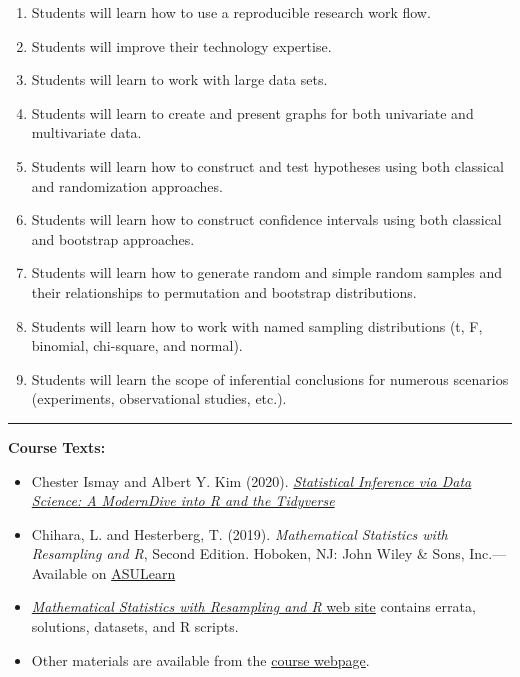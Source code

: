\documentclass[
]{article}
\providecommand{\tightlist}{%
  \setlength{\itemsep}{0pt}\setlength{\parskip}{0pt}}
\begin{document}
\begin{enumerate}
\def\labelenumi{\arabic{enumi}.}
\tightlist
\item
  Students will learn how to use a reproducible research work flow.
\item
  Students will improve their technology expertise.
\item
  Students will learn to work with large data sets.
\item
  Students will learn to create and present graphs for both univariate
  and multivariate data.
\item
  Students will learn how to construct and test hypotheses using both
  classical and randomization approaches.
\item
  Students will learn how to construct confidence intervals using both
  classical and bootstrap approaches.
\item
  Students will learn how to generate random and simple random samples
  and their relationships to permutation and bootstrap distributions.
\item
  Students will learn how to work with named sampling distributions (t,
  F, binomial, chi-square, and normal).
\item
  Students will learn the scope of inferential conclusions for numerous
  scenarios (experiments, observational studies, etc.).
\end{enumerate}

\begin{center}\rule{0.5\linewidth}{0.5pt}\end{center}

\textbf{Course Texts:}

\begin{itemize}
\item
  Chester Ismay and Albert Y. Kim (2020).
  \href{htpps://moderndive.com}{\emph{Statistical Inference via Data
  Science: A ModernDive into R and the Tidyverse }}
\item
  Chihara, L. and Hesterberg, T. (2019). \emph{Mathematical Statistics
  with Resampling and R}, Second Edition. Hoboken, NJ: John Wiley \&
  Sons, Inc.---Available on
  \href{https://asulearn.appstate.edu/course/view.php?id=159655}{ASULearn}
\item
  \href{https://sites.google.com/site/chiharahesterberg/home}{\emph{Mathematical
  Statistics with Resampling and R} web site} contains errata,
  solutions, datasets, and R scripts.
\item
  Other materials are available from the
  \href{https://alanarnholt.github.io/STT3850/}{course webpage}.
\end{itemize}
\end{document}
